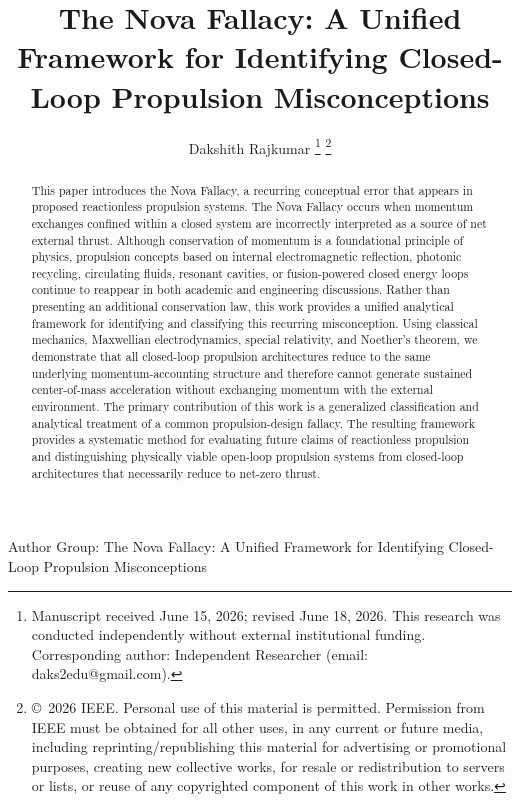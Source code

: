 \documentclass[journal,10pt,twoside]{IEEEtran}
\begin{document}
\title{The Nova Fallacy: A Unified Framework for Identifying Closed-Loop Propulsion Misconceptions}

\author{Dakshith Rajkumar%
\thanks{Manuscript received June 15, 2026; revised June 18, 2026. This research was conducted independently without external institutional funding. Corresponding author: Independent Researcher (email: daks2edu@gmail.com).}%
\thanks{\copyright~2026 IEEE. Personal use of this material is permitted. Permission from IEEE must be obtained for all other uses, in any current or future media, including reprinting/republishing this material for advertising or promotional purposes, creating new collective works, for resale or redistribution to servers or lists, or reuse of any copyrighted component of this work in other works.}}

%
{Author Group: The Nova Fallacy: A Unified Framework for Identifying Closed-Loop Propulsion Misconceptions}

\maketitle

\begin{abstract}
This paper introduces the Nova Fallacy, a recurring conceptual error that appears in proposed reactionless propulsion systems. The Nova Fallacy occurs when momentum exchanges confined within a closed system are incorrectly interpreted as a source of net external thrust. Although conservation of momentum is a foundational principle of physics, propulsion concepts based on internal electromagnetic reflection, photonic recycling, circulating fluids, resonant cavities, or fusion-powered closed energy loops continue to reappear in both academic and engineering discussions.
Rather than presenting an additional conservation law, this work provides a unified analytical framework for identifying and classifying this recurring misconception. Using classical mechanics, Maxwellian electrodynamics, special relativity, and Noether’s theorem, we demonstrate that all closed-loop propulsion architectures reduce to the same underlying momentum-accounting structure and therefore cannot generate sustained center-of-mass acceleration without exchanging momentum with the external environment.
The primary contribution of this work is a generalized classification and analytical treatment of a common propulsion-design fallacy. The resulting framework provides a systematic method for evaluating future claims of reactionless propulsion and distinguishing physically viable open-loop propulsion systems from closed-loop architectures that necessarily reduce to net-zero thrust.
\end{abstract}
\end{document}

